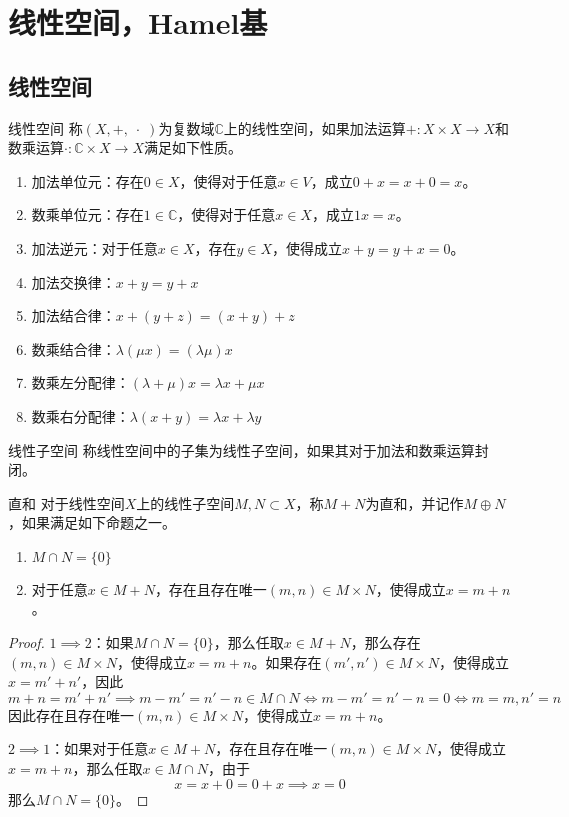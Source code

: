 \documentclass[lang = cn, scheme = chinese, thmcnt = section]{elegantbook}
\newcommand{\C}{\mathbb{C}}  		   %
\newcommand{\sub}{\subset}             %
\begin{document}
\section{线性空间，Hamel基}

\subsection{线性空间}

\begin{definition}{线性空间}
	称$(X,+,\;\cdot\;)$为复数域$\C$上的线性空间，如果加法运算$+:X\times X\to X$和数乘运算$\cdot:\C\times X\to X$满足如下性质。
	\begin{enumerate}
		\item 加法单位元：存在$0\in X$，使得对于任意$x\in V$，成立$0+x=x+0=x$。
		\item 数乘单位元：存在$1\in \C$，使得对于任意$x\in X$，成立$1x=x$。
		\item 加法逆元：对于任意$x\in X$，存在$y\in X$，使得成立$x+y=y+x=0$。
		\item 加法交换律：$x+y=y+x$
		\item  加法结合律：$x+(y+z)=(x+y)+z$
		\item 数乘结合律：$\lambda(\mu  x)=(\lambda\mu) x$
		\item  数乘左分配律：$(\lambda+\mu) x=\lambda  x+\mu x$
		\item 数乘右分配律：$\lambda(x+y)=\lambda  x+\lambda y$
	\end{enumerate}
\end{definition}

\begin{definition}{线性子空间}
	称线性空间中的子集为线性子空间，如果其对于加法和数乘运算封闭。
\end{definition}

\begin{definition}{直和}
	对于线性空间$X$上的线性子空间$M,N\sub X$，称$M+N$为直和，并记作$M\oplus N$，如果满足如下命题之一。
	\begin{enumerate}
		\item $M\cap N=\{0\}$
		\item 对于任意$x\in M+N$，存在且存在唯一$(m,n)\in M\times N$，使得成立$x=m+n$。
	\end{enumerate}
\end{definition}

\begin{proof}
	$1\implies 2$：如果$M\cap N=\{0\}$，那么任取$x\in M+N$，那么存在$(m,n)\in M\times N$，使得成立$x=m+n$。如果存在$(m',n')\in M\times N$，使得成立$x=m'+n'$，因此
	$$
	m+n=m'+n'\implies m-m'=n'-n\in M\cap N\iff m-m'=n'-n=0\iff m=m,n'=n
	$$
	因此存在且存在唯一$(m,n)\in M\times N$，使得成立$x=m+n$。
	
	$2\implies 1$：如果对于任意$x\in M+N$，存在且存在唯一$(m,n)\in M\times N$，使得成立$x=m+n$，那么任取$x\in M\cap N$，由于
	$$
	x=x+0=0+x\implies x=0
	$$
	那么$M\cap N=\{0\}$。
\end{proof}
\end{document}
